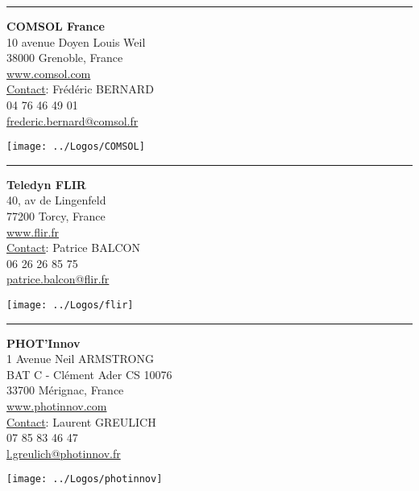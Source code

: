 \hrule
%
\vspace{1.5mm}
\noindent
\begin{minipage}{0.5\textwidth}
\textbf{COMSOL France}\\
10 avenue Doyen Louis Weil\\
38000 Grenoble, France\\
\url{www.comsol.com}\\
\underline{Contact}: Frédéric BERNARD\\
\hspace*{1em}\Telefon{} 04 76 46 49 01\\
\hspace*{1em}\Letter{} \url{frederic.bernard@comsol.fr}
\end{minipage}
\begin{minipage}{0.48\textwidth}
\texttt{[image: ../Logos/COMSOL]}
\end{minipage}
\vspace{1.5mm}
%
\hrule
%
\vspace{1.5mm}
\noindent
\begin{minipage}{0.5\textwidth}
\textbf{Teledyn FLIR}\\
40, av de Lingenfeld\\
77200 Torcy, France\\
\url{www.flir.fr}\\
\underline{Contact}: Patrice BALCON\\
\hspace*{1em}\Telefon{} 06 26 26 85 75\\
\hspace*{1em}\Letter{} \url{patrice.balcon@flir.fr}
\end{minipage}
\begin{minipage}{0.48\textwidth}
\texttt{[image: ../Logos/flir]}
\end{minipage}
\vspace{1.5mm}
%
\hrule
%
\vspace{1.5mm}
\noindent
\begin{minipage}{0.5\textwidth}
\textbf{PHOT'Innov}\\ 
1 Avenue Neil ARMSTRONG\\
BAT C - Clément Ader CS 10076\\
33700 Mérignac, France\\
\url{www.photinnov.com}\\
\underline{Contact}: Laurent GREULICH\\
\hspace*{1em}\Telefon{} 07 85 83 46 47\\
\hspace*{1em}\Letter{} \url{l.greulich@photinnov.fr}
\end{minipage}
\begin{minipage}{0.48\textwidth}
\texttt{[image: ../Logos/photinnov]}
\end{minipage}
\vspace{1.5mm}

